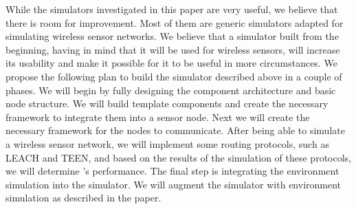 
While the simulators investigated in this paper are very useful, we believe
that there is room for improvement. Most of them are generic simulators
adapted for simulating wireless sensor networks. 
We believe that a simulator built from the beginning, having in mind that it
will be used for wireless sensors, will increase its usability and make it
possible for it to be useful in more circumstances.
We propose the following plan to build the simulator described above in a couple
of phases.
We will begin by fully designing the component architecture and basic node
structure. We will build template components and create the necessary framework to integrate them 
into a sensor node. Next we will create the necessary framework for the nodes
to communicate. 
After being able to simulate a wireless sensor network, we will implement some
routing protocols, such as LEACH and TEEN, and based on the results of the
simulation of these protocols, we will determine \codename's performance.
The final step is integrating the environment simulation into the simulator.
We will augment the simulator with environment simulation as described in the paper.
